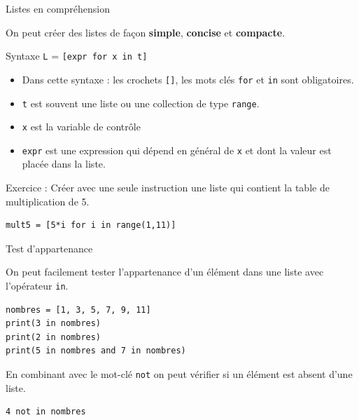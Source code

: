 \documentclass[10pt]{beamer}
\begin{document}
\begin{frame}[fragile]{Listes en compréhension}

On peut créer des listes de façon \textbf{simple}, \textbf{concise} et
\textbf{compacte}.\\


\begin{alertblock}{Syntaxe}
\texttt{L} = \texttt{{[}expr\ for\ x\ in\ t{]}}
\end{alertblock}

\begin{itemize}
\item
  Dans cette syntaxe : les crochets \texttt{{[}{]}}, les mots clés
  \texttt{for} et \texttt{in} sont obligatoires.
\item
  \texttt{t} est souvent une liste ou une collection de type
  \texttt{range}.
\item
  \texttt{x} est la variable de contrôle
\item
  \texttt{expr} est une expression qui dépend en général de \texttt{x}
  et dont la valeur est placée dans la liste.
\end{itemize}


\vspace{0.5 cm}

Exercice : Créer avec une seule instruction une liste qui contient la table de multiplication de 5.

\pause
\begin{exampleblock}{}
\begin{verbatim}
mult5 = [5*i for i in range(1,11)]
\end{verbatim}
\end{exampleblock}
\end{frame}

\begin{frame}[fragile]{Test d’appartenance}

On peut facilement tester l'appartenance d'un élément dans une liste avec l'opérateur \texttt{in}.

\begin{exampleblock}{}
\begin{verbatim}
nombres = [1, 3, 5, 7, 9, 11]
print(3 in nombres)
print(2 in nombres)
print(5 in nombres and 7 in nombres)
\end{verbatim}
\end{exampleblock}

\vspace{1 cm}

En combinant avec le mot-clé \texttt{not} on peut vérifier si un élément est absent d'une liste.

\begin{exampleblock}{}
\begin{verbatim}
4 not in nombres
\end{verbatim}
\end{exampleblock}

\end{frame}
\end{document}
